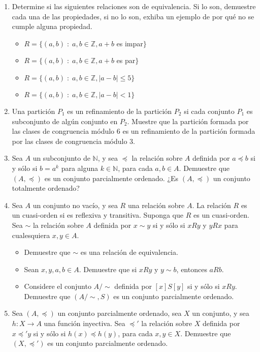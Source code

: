 \documentclass[letterpaper,11pt]{article}
\begin{document}
\begin{enumerate}
    \item Determine si las siguientes relaciones son de equivalencia. Si lo son,
    demuestre cada una de las propiedades, si no lo son, exhiba un ejemplo de  
    por qué no se cumple alguna propiedad.
    \begin{itemize}
        \item $R = \{(a,b) \; : \; a,b \in ℤ, a+b$ es impar$\}$
        \item $R = \{(a,b) \; : \; a,b \in ℤ, a+b$ es par$\}$
        \item $R = \{(a,b) \; : \; a,b \in ℤ, |a-b| \leq 5\}$
        \item $R = \{(a,b) \; : \; a, b \in ℤ, |a-b| < 1\}$
    \end{itemize}

    \item Una partición $P_{1}$ es un refinamiento de la partición $P_{2}$ si 
    cada conjunto $P_{1}$ es subconjunto de algún conjunto en $P_{2}$. Muestre 
    que la partición formada por las clases de congruencia módulo $6$ es un 
    refinamiento de la partición formada por las clases de congruencia módulo 
    $3$.

    \item Sea $A$ un subconjunto de $ℕ$, y sea $\preceq$ la relación sobre $A$
    definida por $a \preceq b$ si y sólo si $b = a^{k}$ para alguna $k \in ℕ$,
    para cada $a,b \in A$. Demuestre que $(A, \preceq)$ es un conjunto 
    parcialmente ordenado. ¿Es $(A, \preceq)$ un conjunto totalmente ordenado?

    \item Sea $A$ un conjunto no vacío, y sea $R$ una relación sobre $A$. La 
    relación $R$ es un cuasi-orden si es reflexiva y transitiva. Suponga que 
    $R$ es un cuasi-orden. Sea $\sim$ la relación sobre $A$ definida por 
    $x \sim y$ si y sólo si $xRy$ y $yRx$ para cualesquiera $x, y \in A$.

    \begin{itemize}
        \item Demuestre que $\sim$ es una relación de equivalencia.
        \item Sean $x, y, a, b \in A$. Demuestre que si $xRy$  y $y \sim b$,
        entonces $aRb$.
        \item Considere el conjunto $A/\sim$ definida por $[x]S[y]$ si y sólo 
        si $xRy$. Demuestre que $(A/\sim, S)$ es un conjunto parcialmente
        ordenado.
    \end{itemize}

    \item Sea $(A, \preceq)$ un conjunto parcialmente ordenado, sea $X$ un 
    conjunto, y sea $h: X → A$ una función inyectiva. Sea $\preceq'$ la 
    relación sobre $X$ definida por $x \preceq' y$ si y sólo si $h(x) 
    \preceq h(y)$, para cada $x, y \in X$. Demuestre que $(X, \preceq')$ es 
    un conjunto parcialmente ordenado.
\end{enumerate}
\end{document}
